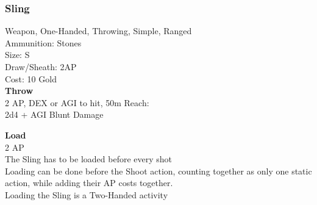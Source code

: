 \subsubsection{Sling}\label{weapon:sling}
Weapon, One-Handed, Throwing, Simple, Ranged\\
Ammunition: Stones\\
Size: S\\
Draw/Sheath: 2AP\\
Cost: 10 Gold\\

\textbf{Throw}\\
2 AP, DEX or AGI to hit, 50m Reach:\\
2d4 + \texttimes AGI Blunt Damage

\textbf{Load}\\
2 AP\\
The Sling has to be loaded before every shot\\
Loading can be done before the Shoot action, counting together as only one static action, while adding their AP costs together.\\
Loading the Sling is a Two-Handed activity
